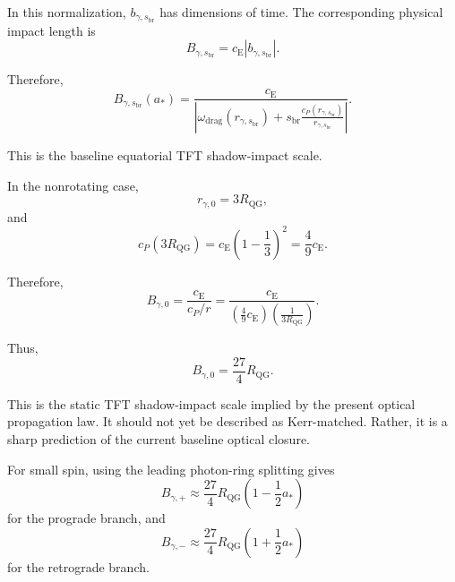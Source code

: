 In this normalization, $b_{\gamma,s_{\mathrm{br}}}$ has dimensions of time. The corresponding physical impact length is
\begin{equation}
    B_{\gamma,s_{\mathrm{br}}} = c_{\mathrm{E}} \left| b_{\gamma,s_{\mathrm{br}}} \right|.
\end{equation}

Therefore,
\begin{equation}
    \boxed{ B_{\gamma,s_{\mathrm{br}}}(a_\ast) = \frac{ c_{\mathrm{E}} }{ \left| \omega_{\mathrm{drag}}(r_{\gamma,s_{\mathrm{br}}}) + s_{\mathrm{br}} \frac{c_P(r_{\gamma,s_{\mathrm{br}}})}{r_{\gamma,s_{\mathrm{br}}}} \right| }. }
\end{equation}

This is the baseline equatorial TFT shadow-impact scale.

In the nonrotating case,
\begin{equation}
    r_{\gamma,0} = 3R_{\mathrm{QG}},
\end{equation}
and
\begin{equation}
    c_P(3R_{\mathrm{QG}}) = c_{\mathrm{E}} \left( 1-\frac{1}{3} \right)^2 = \frac{4}{9}c_{\mathrm{E}}.
\end{equation}

Therefore,
\begin{equation}
    B_{\gamma,0} = \frac{c_{\mathrm{E}}}{ c_P/r } = \frac{c_{\mathrm{E}}}{ \left( \frac{4}{9}c_{\mathrm{E}} \right) \left( \frac{1}{3R_{\mathrm{QG}}} \right) }.
\end{equation}

Thus,
\begin{equation}
    \boxed{ B_{\gamma,0} = \frac{27}{4}R_{\mathrm{QG}}. }
\end{equation}

This is the static TFT shadow-impact scale implied by the present optical propagation law. It should not yet be described as Kerr-matched. Rather, it is a sharp prediction of the current baseline optical closure.

For small spin, using the leading photon-ring splitting gives
\begin{equation}
    \boxed{ B_{\gamma,+} \approx \frac{27}{4}R_{\mathrm{QG}} \left( 1-\frac{1}{2}a_\ast \right) }
\end{equation}
for the prograde branch, and
\begin{equation}
    \boxed{ B_{\gamma,-} \approx \frac{27}{4}R_{\mathrm{QG}} \left( 1+\frac{1}{2}a_\ast \right) }
\end{equation}
for the retrograde branch.

